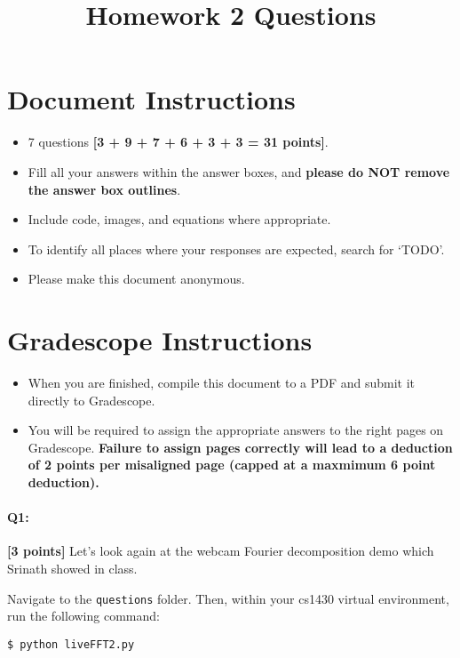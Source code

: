 \date{}

\title{\vspace{-1cm}Homework 2 Questions}



\maketitle
\vspace{-3cm}
\thispagestyle{fancy}


\section*{ Document Instructions}
\begin{itemize}
  \item 7 questions \textbf{[3 + 9 + 7 + 6 + 3 + 3 = 31 points]}.
  \item Fill all your answers within the answer boxes, and \textbf{please do NOT remove the answer box outlines}.
  \item Include code, images, and equations where appropriate.
  \item To identify all places where your responses are expected, search for `TODO'.
  \item Please make this document anonymous.
\end{itemize}

\section*{ Gradescope Instructions}
\begin{itemize}
  \item When you are finished, compile this document to a PDF and submit it directly to Gradescope. 
  \item You will be required to assign the appropriate answers to the right pages on Gradescope. \textbf{Failure to assign pages correctly will lead to a deduction of 2 points per misaligned page (capped at a maxmimum 6 point deduction).}
\end{itemize}
\pagebreak


\paragraph{Q1:} \textbf{[3 points]} Let's look again at the webcam Fourier decomposition demo which Srinath showed in class. 

Navigate to the \texttt{questions} folder. Then, within your cs1430 virtual environment, run the following command:
\begin{verbatim}
$ python liveFFT2.py
\end{verbatim}

